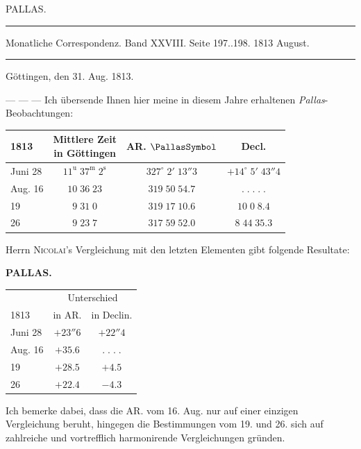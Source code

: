 \par\bigskip
{}
\hypertarget{native-373-lower}{}\label{native-373-lower}
\begin{center}\large PALLAS.\end{center}
\begin{center}
\parbox{.73\linewidth}{%
\centering\fontsize{8.2}{10.2}\selectfont
\hrule height .3pt\relax\vspace{2.5pt}
Monatliche Correspondenz. Band XXVIII. Seite 197..198. 1813 August.\par
\vspace{2.5pt}\hrule height .3pt\relax
}
\end{center}

\begin{flushright}
Göttingen, den 31. Aug. 1813.
\end{flushright}

\par\indent --- --- --- Ich übersende Ihnen hier meine in diesem Jahre erhaltenen \emph{Pallas}-Beobachtungen:

\begin{center}\fontsize{10}{12}\selectfont\setlength{\tabcolsep}{5pt}\renewcommand{\arraystretch}{1.15}\begin{tabular}{l|c|c|c}
1813 & \shortstack{Mittlere Zeit\\in Göttingen} & AR. $\PallasSymbol$ & Decl.\\\hline
Juni 28 & $11^{\mathrm u}\;37^{\mathrm m}\;2^{\mathrm s}$ & $327^\circ\;2'\;13''3$ & $+14^\circ\;5'\;43''4$\\
Aug. 16 & $10\;36\;23$ & $319\;50\;54.7$ & $.\;.\;.\;.\;.$\\
19 & $9\;31\;0$ & $319\;17\;10.6$ & $10\;0\;8.4$\\
26 & $9\;23\;7$ & $317\;59\;52.0$ & $8\;44\;35.3$\\
\end{tabular}\end{center}

\par\indent Herrn \textsc{Nicolai}'s Vergleichung mit den letzten Elementen gibt folgende Resultate:\par
\clearpage
\thispagestyle{empty}
\noindent{}%
\makebox[12mm][l]{}%
\parbox[t]{\dimexpr\linewidth-24mm\relax}{\centering\footnotesize\bfseries PALLAS.\par}%
\par\nobreak\medskip
\begin{center}\fontsize{10}{12}\selectfont\setlength{\tabcolsep}{7pt}\renewcommand{\arraystretch}{1.15}\begin{tabular}{l|c|c}
 & \multicolumn{2}{c}{Unterschied}\\
1813 & in AR. & in Declin.\\\hline
Juni 28 & $+23''6$ & $+22''4$\\
Aug. 16 & $+35.6$ & $.\;.\;.\;.$\\
19 & $+28.5$ & $+4.5$\\
26 & $+22.4$ & $-4.3$\\
\end{tabular}\end{center}

\par\indent Ich bemerke dabei, dass die AR. vom 16. Aug. nur auf einer einzigen Vergleichung beruht,
hingegen die Bestimmungen vom 19. und 26. sich auf zahlreiche und vortrefflich harmonirende
Vergleichungen gründen.


